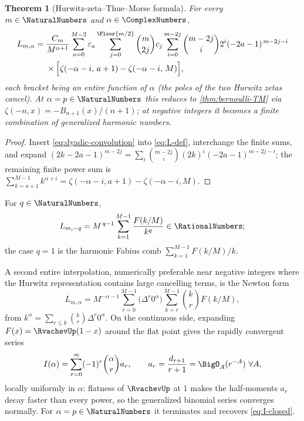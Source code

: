 \documentclass[11pt,oneside]{article}
\numberwithin{equation}{section}
\newtheorem{theorem}{Theorem}[section]
\theoremstyle{definition}
\theoremstyle{remark}
\newcommand{\eps}{\varepsilon}
\begin{document}
\begin{theorem}[Hurwitz-zeta--Thue--Morse formula]
\label{thm:Hurwitz-comb}
For every $m\in\NaturalNumbers$ and $\alpha\in\ComplexNumbers$,
\begin{equation}
\begin{split}
 L_{m,\alpha}
 ={}&\frac{C_m}{M^{\alpha+1}}
 \sum_{a=0}^{M-2}\eps_a
 \sum_{j=0}^{\Floor{m/2}}\binom m{2j}c_j
 \sum_{i=0}^{m-2j}\binom{m-2j}{i}2^{i}(-2a-1)^{\,m-2j-i}\\
 &\times\Bigl[
 \zeta(-\alpha-i,\,a+1)-\zeta(-\alpha-i,\,M)
 \Bigr],
\end{split}
 \label{eq:Hurwitz-comb}
\end{equation}
each bracket being an entire function of $\alpha$ (the poles of the
two Hurwitz zetas cancel).  At $\alpha=p\in\NaturalNumbers$ this reduces to
\cref{thm:bernoulli-TM} via $\zeta(-n,x)=-B_{n+1}(x)/(n+1)$; at
negative integers it becomes a finite combination of generalized
harmonic numbers.
\end{theorem}

\begin{proof}
Insert \eqref{eq:dyadic-convolution} into \eqref{eq:L-def},
interchange the finite sums, and expand
$(2k-2a-1)^{m-2j}
=\sum_i\binom{m-2j}i(2k)^{i}(-2a-1)^{m-2j-i}$; the remaining finite
power sum is
$\sum_{k=a+1}^{M-1}k^{\alpha+i}
=\zeta(-\alpha-i,a+1)-\zeta(-\alpha-i,M)$.
\end{proof}

\begin{corollary}
\label{cor:negative-rational}
For $q\in\NaturalNumbers$,
\begin{equation}
 L_{m,-q}
 =M^{\,q-1}\sum_{k=1}^{M-1}\frac{F(k/M)}{k^{q}}\in\RationalNumbers;
 \label{eq:negative-rational}
\end{equation}
the case $q=1$ is the harmonic Fabius comb
$\sum_{k=1}^{M-1}F(k/M)/k$.
\end{corollary}

A second entire interpolation, numerically preferable near negative
integers where the Hurwitz representation contains large cancelling
terms, is the Newton form
\begin{equation}
 L_{m,\alpha}=M^{-\alpha-1}
 \sum_{r=0}^{M-1}\bigl(\Delta^{r}0^{\alpha}\bigr)
 \sum_{k=r}^{M-1}\binom kr F(k/M),
 \label{eq:Newton-comb}
\end{equation}
from $k^{\alpha}=\sum_{r\le k}\binom kr\Delta^{r}0^{\alpha}$.  On the
continuous side, expanding $F(x)=\RvachevUp(1-x)$ around the flat point gives
the rapidly convergent series
\begin{equation}
 I(\alpha)=\sum_{r=0}^{\infty}(-1)^{r}\binom{\alpha}{r}a_r,
 \qquad
 a_r=\frac{d_{r+1}}{r+1}
 =\BigO_A(r^{-A})\ \forall A,
 \label{eq:I-alpha-series}
\end{equation}
locally uniformly in $\alpha$: flatness of $\RvachevUp$ at $1$ makes the
half-moments $a_r$ decay faster than every power, so the generalized
binomial series converges normally.  For $\alpha=p\in\NaturalNumbers$ it
terminates and recovers \eqref{eq:I-closed}.
\end{document}
